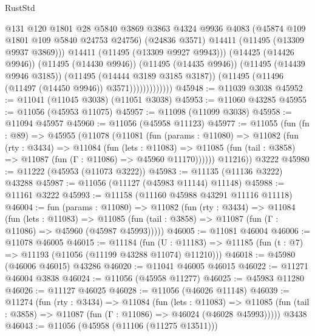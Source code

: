 \begin{lexlean}{RustStd}
\begin{coremodule}
                              @131
                              @120
                              @1801
                              @28
                              @5840
                              @3869
                              @3863
                              @4324
                              @9936
                              @4083
                              (@45874 @109 @1801 @109 @5840 @24753 @24756)
                              (@24836 @3571)
                              @14411
                              (@11495 (@13309 @9937 @3869)))
                            @14411
                            (@11495 (@13309 @9927 @9943)))
                          (@14425 (@14426 @9946))
                          (@11495 (@14430 @9946))
                          (@11495 (@14435 @9946))
                          (@11495 (@14439 @9946 @3185))
                          (@11495 (@14444 @3189 @3185 @3187))
                          (@11495 (@11496 (@11497 (@14450 @9946)) @3571)))))))))))))
@45948 := @11039 @3038
@45952 := @11041 (@11045 @3038) (@11051 @3038)
@45953 := @11060 @43285
@45955 := @11056 (@45953 @11075)
@45957 := @11098 (@11099 @3038)
@45958 := @11094 @45957
@45960 := @11056 (@45958 @11123)
@45977 := @11055
    (fun (fn : @89) =>
    @45955
      (@11078
        (@11081
          (fun (params : @11080) =>
          @11082
            (fun (rty : @3434) =>
            @11084
              (fun (lets : @11083) =>
              @11085 (fun (tail : @3858) => @11087 (fun (Γ : @11086) => @45960 @11170))))))
        @11216))
    @3222
@45980 := @11222 (@45953 (@11073 @3222))
@45983 := @11135 (@11136 @3222) @43288
@45987 := @11056 (@11127 (@45983 @11144) @11148)
@45988 := @11161 @3222
@45993 := @11158 (@11160 @45988 @43291 @11116 @11118)
@46004 := fun (params : @11080) =>
  @11082
    (fun (rty : @3434) =>
    @11084
      (fun (lets : @11083) =>
      @11085 (fun (tail : @3858) => @11087 (fun (Γ : @11086) => @45960 (@45987 @45993)))))
@46005 := @11081 @46004
@46006 := @11078 @46005
@46015 := @11184
    (fun (U : @11183) => @11185 (fun (t : @7) => @11193 (@11056 (@11199 @43288 @11074) @11210)))
@46018 := @45980 (@46006 @46015) @43286
@46020 := @11041 @46005 @46015
@46022 := @11271 @46004 @3838
@46024 := @11056 (@45958 @11277)
@46025 := @45983 @11280
@46026 := @11127 @46025
@46028 := @11056 (@46026 @11148)
@46039 := @11274
    (fun (rty : @3434) =>
    @11084
      (fun (lets : @11083) =>
      @11085 (fun (tail : @3858) => @11087 (fun (Γ : @11086) => @46024 (@46028 @45993)))))
    @3438
@46043 := @11056 (@45958 (@11106 (@11275 @13511)))

\end{coremodule}
\end{lexlean}
